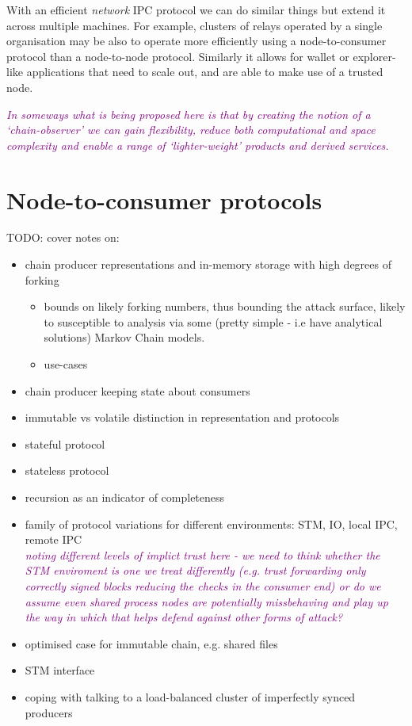 \documentclass{article}
\newcommand{\njd}[1]{\textcolor{purple}{\emph{#1}}}
\theoremstyle{definition}{
  \newtheorem{lemma}{Lemma}[section] %
  \newtheorem{definition}[lemma]{Definition}
}
\theoremstyle{theorem}{
  \newtheorem{invariant}[lemma]{Invariant}
  \newtheorem{proofobligation}[lemma]{Proof Obligation}
}
\numberwithin{equation}{lemma}
\begin{document}
With an efficient \emph{network} IPC protocol we can do similar things but
extend it across multiple machines. For example, clusters of relays operated
by a single organisation may be also to operate more efficiently using a
node-to-consumer protocol than a node-to-node protocol. Similarly it allows for
wallet or explorer-like applications that need to scale out, and are able to
make use of a trusted node.

\njd{In someways what is being proposed here is that by creating the notion of
  a `chain-observer' we can gain flexibility, reduce both computational and
  space complexity and enable a range of `lighter-weight' products and derived
  services.
  }

\section{Node-to-consumer protocols}

TODO: cover notes on:
\begin{itemize}
\item chain producer representations and in-memory storage with high degrees of forking
  \begin{itemize}
  \item bounds on likely forking numbers, thus bounding the attack surface,
    likely to susceptible to analysis via some (pretty simple - i.e have
    analytical solutions) Markov Chain models.
    \item use-cases
  \end{itemize}
\item chain producer keeping state about consumers
\item immutable vs volatile distinction in representation and protocols
\item stateful protocol
\item stateless protocol
\item recursion as an indicator of completeness \marginpar{\njd{what does this mean Duncan?}}
\item family of protocol variations for different environments: STM, IO, local
  IPC, remote IPC
  \njd{\\noting different levels of implict trust here - we need
    to think whether the STM enviroment is one we treat differently (e.g. trust
    forwarding only correctly signed blocks reducing the checks in the consumer
    end) or do we assume even shared process nodes are potentially missbehaving
    and play up the way in which that helps defend against other forms of attack? }
\item optimised case for immutable chain, e.g. shared files
\item STM interface
\item coping with talking to a load-balanced cluster of imperfectly synced producers
\end{itemize}
\end{document}
